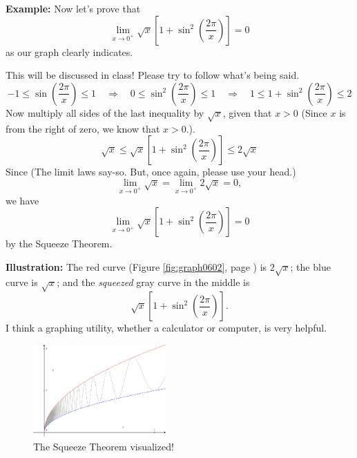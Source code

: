 \documentclass[12pt,addpoints, answers, fleqn]{exam}
\begin{document}
\textbf{Example:} Now let's prove that
\[
\mathop {\lim }\limits_{x \to 0^+}
\sqrt{x}\left[ 1 + \sin^2 \left( \frac{2 \pi}{x} \right) \right] = 0
\]
as our graph clearly indicates.



\begin{solution}
This will be discussed in class! Please try to follow what's being said.
\[
-1 \leq \sin \left( \frac{2 \pi}{x} \right) \leq 1 \quad
\Rightarrow \quad 0 \leq \sin^2 \left( \frac{2 \pi}{x} \right) \leq 1
\quad \Rightarrow \quad 1 \leq 1 + \sin^2 \left( \frac{2 \pi}{x} \right) \leq 2
\]
Now multiply all sides of the last inequality by $\sqrt{x}$, given that $x > 0$ (Since $x$ is from the right of zero, we know that $x > 0$.).
\[
\sqrt{x} \leq \sqrt{x}\left[ 1 + \sin^2 \left( \frac{2 \pi}{x} \right) \right] \leq 2 \sqrt{x}
\]
Since (The limit laws say-so. But, once again, please use your head.)
\[
\mathop {\lim }\limits_{x \to 0^+} \sqrt{x} =
\mathop {\lim }\limits_{x \to 0^+} 2 \sqrt{x} = 0,
\]
we have
\[
\mathop {\lim }\limits_{x \to 0^+}
\sqrt{x}\left[ 1 + \sin^2 \left( \frac{2 \pi}{x} \right) \right] =0
\]
by the Squeeze Theorem.
\end{solution}

\textbf{Illustration:} The red curve (Figure \ref{fig:graph0602}, page \pageref{fig:graph0602}) is $2 \sqrt{x}$; the blue curve is $\sqrt{x}$; and the \emph{squeezed} gray curve in the middle is
\[
\sqrt{x}\left[ 1 + \sin^2 \left( \frac{2 \pi}{x} \right) \right].
\]
I think a graphing utility, whether a calculator or computer, is very helpful.
\begin{figure}[htbp] %
   \centering
   \includegraphics[width=2in]{./graphics/graph0601.pdf} 
   \caption{The Squeeze Theorem visualized!}
   \label{fig:graph0601}
\end{figure}
\end{document}

